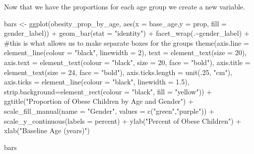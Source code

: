 \documentclass[
  letterpaper,
  DIV=11,
  numbers=noendperiod]{scrreprt}
\newenvironment{Shaded}{\begin{snugshade}}{\end{snugshade}}
\newcommand{\AttributeTok}[1]{\textcolor[rgb]{0.40,0.45,0.13}{#1}}
\newcommand{\CommentTok}[1]{\textcolor[rgb]{0.37,0.37,0.37}{#1}}
\newcommand{\DecValTok}[1]{\textcolor[rgb]{0.68,0.00,0.00}{#1}}
\newcommand{\FloatTok}[1]{\textcolor[rgb]{0.68,0.00,0.00}{#1}}
\newcommand{\FunctionTok}[1]{\textcolor[rgb]{0.28,0.35,0.67}{#1}}
\newcommand{\NormalTok}[1]{\textcolor[rgb]{0.00,0.23,0.31}{#1}}
\newcommand{\OtherTok}[1]{\textcolor[rgb]{0.00,0.23,0.31}{#1}}
\newcommand{\SpecialCharTok}[1]{\textcolor[rgb]{0.37,0.37,0.37}{#1}}
\newcommand{\StringTok}[1]{\textcolor[rgb]{0.13,0.47,0.30}{#1}}
\begin{document}
Now that we have the proportions for each age group we create a new
variable.

\begin{Shaded}
\begin{Highlighting}[]
\NormalTok{bars }\OtherTok{\textless{}{-}} \FunctionTok{ggplot}\NormalTok{(obesity\_prop\_by\_age,}
        \FunctionTok{aes}\NormalTok{(}\AttributeTok{x =}\NormalTok{ base\_age,}\AttributeTok{y =}\NormalTok{ prop, }\AttributeTok{fill =}\NormalTok{ gender\_label)) }\SpecialCharTok{+} 
  \FunctionTok{geom\_bar}\NormalTok{(}\AttributeTok{stat =} \StringTok{"identity"}\NormalTok{) }\SpecialCharTok{+}
  \FunctionTok{facet\_wrap}\NormalTok{(.}\SpecialCharTok{\textasciitilde{}}\NormalTok{gender\_label) }\SpecialCharTok{+} \CommentTok{\#this is what allows us to make separate boxes for the groups}
  \FunctionTok{theme}\NormalTok{(}\AttributeTok{axis.line =} \FunctionTok{element\_line}\NormalTok{(}\AttributeTok{colour =} \StringTok{"black"}\NormalTok{, }\AttributeTok{linewidth =} \DecValTok{2}\NormalTok{),}
        \AttributeTok{text =} \FunctionTok{element\_text}\NormalTok{(}\AttributeTok{size =} \DecValTok{20}\NormalTok{),}
        \AttributeTok{axis.text =} \FunctionTok{element\_text}\NormalTok{(}\AttributeTok{colour =} \StringTok{"black"}\NormalTok{, }\AttributeTok{size =} \DecValTok{20}\NormalTok{, }\AttributeTok{face =} \StringTok{"bold"}\NormalTok{),}
        \AttributeTok{axis.title =} \FunctionTok{element\_text}\NormalTok{(}\AttributeTok{size =} \DecValTok{24}\NormalTok{, }\AttributeTok{face =} \StringTok{"bold"}\NormalTok{),}
        \AttributeTok{axis.ticks.length =} \FunctionTok{unit}\NormalTok{(.}\DecValTok{25}\NormalTok{, }\StringTok{"cm"}\NormalTok{),}
        \AttributeTok{axis.ticks =} \FunctionTok{element\_line}\NormalTok{(}\AttributeTok{colour =} \StringTok{"black"}\NormalTok{, }\AttributeTok{linewidth =} \FloatTok{1.5}\NormalTok{),}
        \AttributeTok{strip.background=}\FunctionTok{element\_rect}\NormalTok{(}\AttributeTok{colour =} \StringTok{"black"}\NormalTok{, }\AttributeTok{fill =} \StringTok{"yellow"}\NormalTok{)) }\SpecialCharTok{+}
  \FunctionTok{ggtitle}\NormalTok{(}\StringTok{"Proportion of Obese Children by Age and Gender"}\NormalTok{) }\SpecialCharTok{+}
  \FunctionTok{scale\_fill\_manual}\NormalTok{(}\AttributeTok{name =} \StringTok{"Gender"}\NormalTok{, }\AttributeTok{values =} \FunctionTok{c}\NormalTok{(}\StringTok{"green"}\NormalTok{,}\StringTok{"purple"}\NormalTok{)) }\SpecialCharTok{+}
  \FunctionTok{scale\_y\_continuous}\NormalTok{(}\AttributeTok{labels =}\NormalTok{ percent) }\SpecialCharTok{+}
  \FunctionTok{ylab}\NormalTok{(}\StringTok{"Percent of Obese Children"}\NormalTok{) }\SpecialCharTok{+}
  \FunctionTok{xlab}\NormalTok{(}\StringTok{"Baseline Age (years)"}\NormalTok{)}

\NormalTok{bars}
\end{Highlighting}
\end{Shaded}
\end{document}
